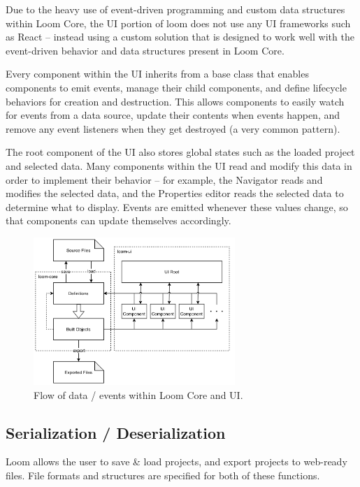 \documentclass[conference, letterpaper]{IEEEtran}
\begin{document}
Due to the heavy use of event-driven programming and custom data structures within Loom Core, the UI portion of loom does not use any UI frameworks such as React -- instead using a custom solution that is designed to work well with the event-driven behavior and data structures present in Loom Core.

Every component within the UI inherits from a base class that enables components to emit events, manage their child components, and define lifecycle behaviors for creation and destruction. This allows components to easily watch for events from a data source, update their contents when events happen, and remove any event listeners when they get destroyed (a very common pattern).

The root component of the UI also stores global states such as the loaded project and selected data. Many components within the UI read and modify this data in order to implement their behavior -- for example, the Navigator reads and modifies the selected data, and the Properties editor reads the selected data to determine what to display. Events are emitted whenever these values change, so that components can update themselves accordingly.

\begin{figure}[!t]
  \centering
  \includegraphics[width=3in]{../dataflow.png}
  \caption{Flow of data / events within Loom Core and UI.}
  \label{fig:dataflow}
\end{figure}

\subsection{Serialization / Deserialization}
Loom allows the user to save \& load projects, and export projects to web-ready files. File formats and structures are specified for both of these functions.
\end{document}
